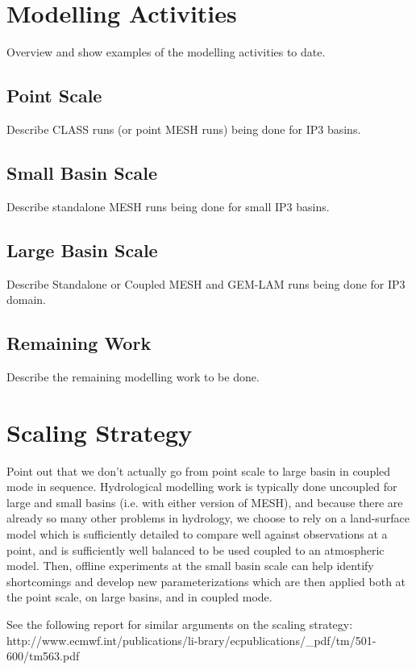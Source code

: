 \documentclass[hess]{copernicus}
\begin{document}
\section{Modelling Activities}
Overview and show examples of the modelling activities to date.

\subsection{Point Scale}
Describe CLASS runs (or point MESH runs) being done for IP3 basins.

\subsection{Small Basin Scale}
Describe standalone MESH runs being done for small IP3 basins.

\subsection{Large Basin Scale}
Describe Standalone or Coupled MESH and GEM-LAM runs being done for IP3 domain.

\subsection{Remaining Work}
Describe the remaining modelling work to be done.

\section{Scaling Strategy}
Point out that we don't actually go from point scale to large basin in coupled mode in sequence. Hydrological modelling work is typically done uncoupled for large and small basins (i.e. with either version of MESH), and because there are already so many other problems in hydrology, we choose to rely on a land-surface model which is sufficiently detailed to compare well against observations at a point, and is sufficiently well balanced to be used coupled to an atmospheric model. Then, offline experiments at the small basin scale can help identify shortcomings and develop new parameterizations which are then applied both at the point scale, on large basins, and in coupled mode.

See the following report for similar arguments on the scaling strategy: http://www.ecmwf.int/publications/li-brary/ecpublications/\_pdf/tm/501-600/tm563.pdf


\conclusions
\end{document}
